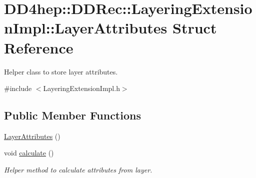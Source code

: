 \hypertarget{struct_d_d4hep_1_1_d_d_rec_1_1_layering_extension_impl_1_1_layer_attributes}{}\section{D\+D4hep\+:\+:D\+D\+Rec\+:\+:Layering\+Extension\+Impl\+:\+:Layer\+Attributes Struct Reference}
\label{struct_d_d4hep_1_1_d_d_rec_1_1_layering_extension_impl_1_1_layer_attributes}


Helper class to store layer attributes.  




{\ttfamily \#include $<$Layering\+Extension\+Impl.\+h$>$}

\subsection*{Public Member Functions}
\begin{DoxyCompactItemize}
\item 
\hyperlink{struct_d_d4hep_1_1_d_d_rec_1_1_layering_extension_impl_1_1_layer_attributes_a74da79c055a10ae02187e41717de53d6}{Layer\+Attributes} ()
\item 
void \hyperlink{struct_d_d4hep_1_1_d_d_rec_1_1_layering_extension_impl_1_1_layer_attributes_acb31b89b26048767becea08cccc4d93f}{calculate} ()
\begin{DoxyCompactList}\small\item\em Helper method to calculate attributes from layer. \end{DoxyCompactList}\end{DoxyCompactItemize}
